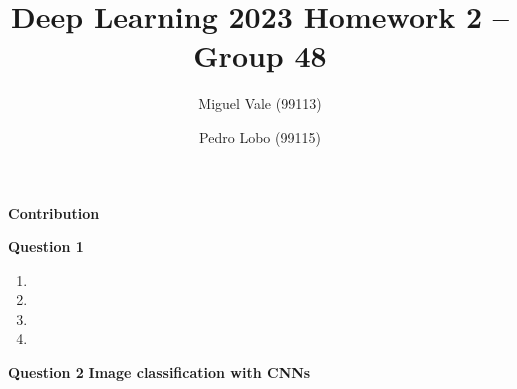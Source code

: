 \documentclass[12pt]{article}
\title{\large{Deep Learning 2023}\vskip 0.2cm Homework 2 -- Group 48}
\date{}
\author{Miguel Vale (99113) \and Pedro Lobo (99115)}
\begin{document}
\maketitle

\center\large{\vskip -1.0cm\textbf{Contribution}}

\begin{justify}
\end{justify}

\center\large{\vskip 0.5cm\textbf{Question 1}}
\begin{enumerate}[leftmargin=\labelsep]

    \item

    \item

    \item

    \item

\end{enumerate}

\vspace{12pt}

\center\large{\textbf{Question 2}}
\center\textbf{Image classification with CNNs}
\end{document}
